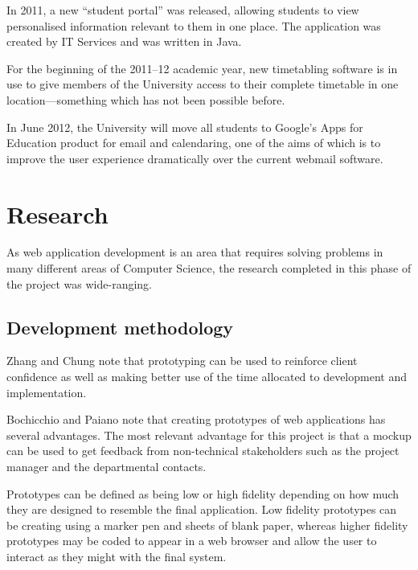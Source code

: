 \documentclass[]{scrartcl}
\begin{document}
In 2011, a new ``student portal'' was released, allowing students to view
personalised information relevant to them in one place. The application was
created by IT Services and was written in Java.

For the beginning of the 2011--12 academic year, new timetabling software is in
use to give members of the University access to their complete timetable in
one location---something which has not been possible before.

In June 2012, the University will move all students to Google's Apps for
Education product for email and calendaring, one of the aims of which is to
improve the user experience dramatically over the current webmail software.

\section{Research}


As web application development is an area that requires solving problems in
many different areas of Computer Science, the research completed in this phase
of the project was wide-ranging.

\subsection{Development methodology}


Zhang and Chung \cite{MODFM_2003} note that prototyping can be used to reinforce client
confidence as well as making better use of the time allocated to development
and implementation.

Bochicchio and Paiano \cite{PrototypingWebApplications_2000} note that
creating prototypes of web applications has several advantages.
The most relevant advantage for this project is that a mockup can be used to
get feedback from non-technical stakeholders such as the project manager and
the departmental contacts.

Prototypes can be defined as being low or high fidelity depending on how much
they are designed to resemble the final application. Low fidelity prototypes
can be creating using a marker pen and sheets of blank paper, whereas higher
fidelity prototypes may be coded to appear in a web browser and allow the user
to interact as they might with the final system.
\end{document}
